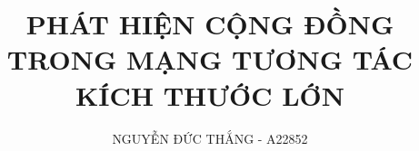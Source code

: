 \documentclass[12pt,oneside]{Classes/uitBA}
\title{{{\Large PHÁT HIỆN CỘNG ĐỒNG TRONG MẠNG TƯƠNG TÁC KÍCH THƯỚC LỚN}}}
\author{{NGUYỄN ĐỨC THẮNG - A22852}}
\begin{document}
	\maketitle
	\setcounter{secnumdepth}{3}
	\setcounter{tocdepth}{3}
	
	\frontmatter %
	
	
	
	\tableofcontents
	\listoffigures
	\listoftables
	\newpage
	\renewcommand{\nomname}{Danh mục ký hiệu và từ viết tắt}
	\renewcommand{\nompreamble}{Dưới đây là danh sách các ký hiệu và từ viết tắt đã được sử dụng trong đề tài này.}
	\printnomenclature[1in]
	
	
	\mainmatter  
	
	
	
	
	
	
	\backmatter
	
	\appendix
	\renewcommand{\thechapter}{\arabic{chapter}}
	\renewcommand{\thesection}{A.\arabic{section}}
	\label{appendixA}
	
	
	
\end{document}
